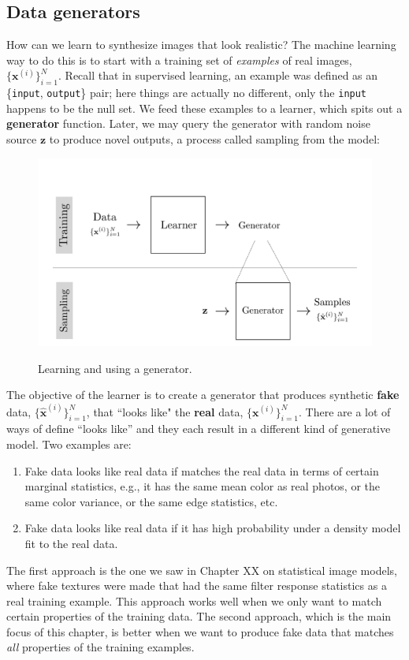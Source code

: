\subsection{Data generators}
How can we learn to synthesize images that look realistic? The machine learning way to do this is to start with a training set of \textit{examples} of real images, $\{\mathbf{x}^{(i)}\}_{i=1}^N$. Recall that in supervised learning, an example was defined as an \{\texttt{input}, \texttt{output}\} pair; here things are actually no different, only the \texttt{input} happens to be the null set. We feed these examples to a learner, which spits out a \textbf{generator} function. Later, we may query the generator with random noise source $\mathbf{z}$ to produce novel outputs, a process called sampling from the model:
\begin{figure}[h]
    \centering
    \includegraphics[width=0.75\linewidth]{./figures/generative_models/gen_model_training_vs_sampling.pdf}
    \label{fig:generative_models:gen_model_training_vs_sampling}
    \caption{Learning and using a generator.}
\end{figure}

The objective of the learner is to create a generator that produces synthetic \textbf{fake} data, $\{\hat{\mathbf{x}}^{(i)}\}_{i=1}^N$, that ``looks like" the \textbf{real} data, $\{\mathbf{x}^{(i)}\}_{i=1}^N$. There are a lot of ways of define ``looks like'' and they each result in a different kind of generative model. Two examples are:
\begin{enumerate}
    \item Fake data looks like real data if matches the real data in terms of certain marginal statistics, e.g., it has the same mean color as real photos, or the same color variance, or the same edge statistics, etc.
    \item Fake data looks like real data if it has high probability under a density model fit to the real data.
\end{enumerate}
The first approach is the one we saw in Chapter XX on statistical image models, where fake textures were made that had the same filter response statistics as a real training example. This approach works well when we only want to match certain properties of the training data. The second approach, which is the main focus of this chapter, is better when we want to produce fake data that matches \textit{all} properties of the training examples.

